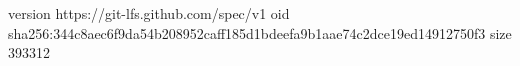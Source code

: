 version https://git-lfs.github.com/spec/v1
oid sha256:344c8aec6f9da54b208952caff185d1bdeefa9b1aae74c2dce19ed14912750f3
size 393312
